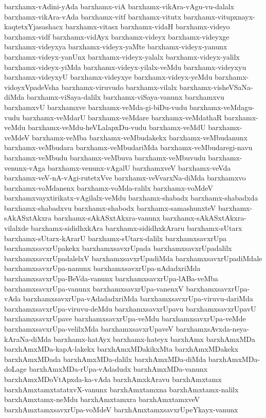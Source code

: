{barxhamx-vAdini-yAda
barxhamx-viA
barxhamx-vikAra-vAgu-vu-dalalx
barxhamx-vikAra-vAda
barxhamx-vitf
barxhamx-vitutx
barxhamx-vitupxnayx-kaqtetxYjasashacx
barxhamx-vitasx
barxhamx-vidaH
barxhamx-videyo
barxhamx-vidf
barxhamx-vidAyx
barxhamx-videyx
barxhamx-videyxge
barxhamx-videyxya
barxhamx-videyx-yaMte
barxhamx-videyx-yanunx
barxhamx-videyx-yanUnx
barxhamx-videyx-yalalx
barxhamx-videyx-yalilx
barxhamx-videyx-yiMda
barxhamx-videyx-yilalx-veMdu
barxhamx-videyxyu
barxhamx-videyxyU
barxhamx-videyxye
barxhamx-videyx-yeMdu
barxhamx-vidoyxVpadeVsha
barxhamx-viruvudo
barxhamx-vilalx
barxhamx-visheVSaNa-diMda
barxhamx-viSaya-dalilx
barxhamx-viSaya-vanunx
barxhamxvu
barxhamxvU
barxhamxve
barxhamx-veMda-gi-biDu-vudu
barxhamx-veMdagu-vudu
barxhamx-veMdarU
barxhamx-veMdare
barxhamx-veMdathaR
barxhamx-veMdu
barxhamx-veMdu-heVLalapxDu-vudu
barxhamx-veMdU
barxhamx-veMdeV
barxhamx-veMba
barxhamx-veMbudakekx
barxhamx-veMbudanunx
barxhamx-veMbudara
barxhamx-veMbudariMda
barxhamx-veMbudaregi-navu
barxhamx-veMbudu
barxhamx-veMbuva
barxhamx-veMbuvudu
barxhamx-venunx-vAga
barxhamx-venunx-vAgalU
barxhamxveV
barxhamx-veVda
barxhamx-veV-nA-vAgi-rutetxVve
barxhamx-veVvarxNa-diMda
barxhamxvo
barxhamx-voMdanenx
barxhamx-voMda-ralilx
barxhamx-voMdeV
barxhamxvayxtirikatx-vAgilalx-veMdu
barxhamx-shabadx
barxhamx-shabadxda
barxhamx-shabadxvu
barxhamx-shabodx
barxhamx-samashunxteV
barxhamx-sAkASxtAkxra
barxhamx-sAkASxtAkxra-vanunx
barxhamx-sAkASxtAkxra-vilalxde
barxhamx-sididhxkAra
barxhamx-sididhxkAraru
barxhamx-sUtarx
barxhamx-sUtarx-kArarU
barxhamx-sUtarx-dalilx
barxhamxsavxrUpa
barxhamxsavxrUpakekx
barxhamxsavxrUpada
barxhamxsavxrUpadalilx
barxhamxsavxrUpadalelxV
barxhamxsavxrUpadiMda
barxhamxsavxrUpadiMdale
barxhamxsavxrUpa-nanunx
barxhamxsavxrUpa-nAdadxriMda
barxhamxsavxrUpa-BeVda-vanunx
barxhamxsavxrUpa-lABa-veMba
barxhamxsavxrUpa-vanunx
barxhamxsavxrUpa-vanenxV
barxhamxsavxrUpa-vAda
barxhamxsavxrUpa-vAdadadxriMda
barxhamxsavxrUpa-viruvu-dariMda
barxhamxsavxrUpa-viruvu-deMdu
barxhamxsavxrUpavu
barxhamxsavxrUpavU
barxhamxsavxrUpave
barxhamxsavxrUpa-veMdu
barxhamxsavxrUpa-veMde
barxhamxsavxrUpa-velilxMda
barxhamxsavxrUpaveV
barxhamxsAvxda-neya-kAraNa-diMda
barxhamx-hatAyx
barxhamx-hateyx
barxhAmx
barxhAmxMDa
barxhAmxMDa-kapA-lakekx
barxhAmxMDakikxMta
barxhAmxMDakekx
barxhAmxMDada
barxhAmxMDa-dalilx
barxhAmxMDa-diMda
barxhAmxMDa-doLage
barxhAmxMDa-rUpa-vAdadudx
barxhAmxMDa-vanunx
barxhAmxMDoVtApxda-ka-vAda
barxhAmxkAravu
barxhAmxtamx
barxhAmxtamxtatatxvX-vanunx
barxhAmxtamxna
barxhAmxtamx-nalilx
barxhAmxtamx-neMdu
barxhAmxtamxra
barxhAmxtamxveV
barxhAmxtamxsavxrUpa-voMdeV
barxhAmxtamxsavxrUpeYkayx-vanunx
}
